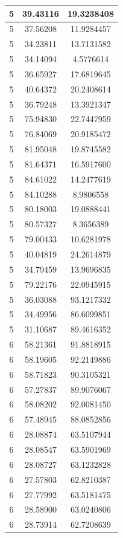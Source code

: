 \documentclass[
]{book}
\begin{document}
\begin{tabular}{c|c|c}
\hline
5 & 39.43116 & 19.3238408\\
\hline
5 & 37.56208 & 11.9284457\\
\hline
5 & 34.23811 & 13.7131582\\
\hline
5 & 34.14094 & 4.5776614\\
\hline
5 & 36.65927 & 17.6819645\\
\hline
5 & 40.64372 & 20.2408614\\
\hline
5 & 36.79248 & 13.3921347\\
\hline
5 & 75.94830 & 22.7447959\\
\hline
5 & 76.84069 & 20.9185472\\
\hline
5 & 81.95048 & 19.8745582\\
\hline
5 & 81.64371 & 16.5917600\\
\hline
5 & 84.61022 & 14.2477619\\
\hline
5 & 84.10288 & 8.9806558\\
\hline
5 & 80.18003 & 19.0888441\\
\hline
5 & 80.57327 & 8.3656389\\
\hline
5 & 79.00433 & 10.6281978\\
\hline
5 & 40.04819 & 24.2614879\\
\hline
5 & 34.79459 & 13.9696835\\
\hline
5 & 79.22176 & 22.0945915\\
\hline
5 & 36.03088 & 93.1217332\\
\hline
5 & 34.49956 & 86.6099851\\
\hline
5 & 31.10687 & 89.4616352\\
\hline
6 & 58.21361 & 91.8818915\\
\hline
6 & 58.19605 & 92.2149886\\
\hline
6 & 58.71823 & 90.3105321\\
\hline
6 & 57.27837 & 89.9076067\\
\hline
6 & 58.08202 & 92.0081450\\
\hline
6 & 57.48945 & 88.0852856\\
\hline
6 & 28.08874 & 63.5107944\\
\hline
6 & 28.08547 & 63.5901969\\
\hline
6 & 28.08727 & 63.1232828\\
\hline
6 & 27.57803 & 62.8210387\\
\hline
6 & 27.77992 & 63.5181475\\
\hline
6 & 28.58900 & 63.0240806\\
\hline
6 & 28.73914 & 62.7208639\\

\end{tabular}
\end{document}
